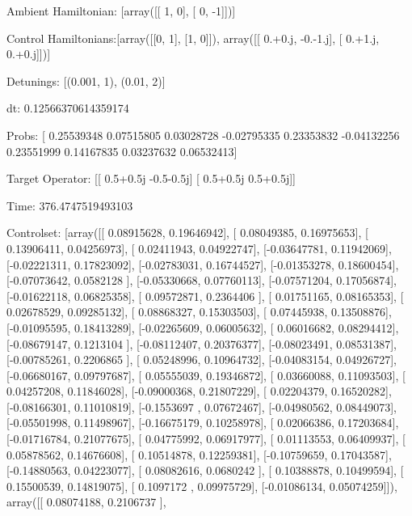 \documentclass{article}
\begin{document}
    

\newpage

Ambient Hamiltonian: [array([[ 1,  0],
       [ 0, -1]])]

Control Hamiltonians:[array([[0, 1],
       [1, 0]]), array([[ 0.+0.j, -0.-1.j],
       [ 0.+1.j,  0.+0.j]])]

Detunings: [(0.001, 1), (0.01, 2)]

 dt: 0.12566370614359174

Probs: [ 0.25539348  0.07515805  0.03028728 -0.02795335  0.23353832 -0.04132256
  0.23551999  0.14167835  0.03237632  0.06532413]

Target Operator: [[ 0.5+0.5j -0.5-0.5j]
 [ 0.5+0.5j  0.5+0.5j]]

Time: 376.4747519493103

Controlset: [array([[ 0.08915628,  0.19646942],
       [ 0.08049385,  0.16975653],
       [ 0.13906411,  0.04256973],
       [ 0.02411943,  0.04922747],
       [-0.03647781,  0.11942069],
       [-0.02221311,  0.17823092],
       [-0.02783031,  0.16744527],
       [-0.01353278,  0.18600454],
       [-0.07073642,  0.0582128 ],
       [-0.05330668,  0.07760113],
       [-0.07571204,  0.17056874],
       [-0.01622118,  0.06825358],
       [ 0.09572871,  0.2364406 ],
       [ 0.01751165,  0.08165353],
       [ 0.02678529,  0.09285132],
       [ 0.08868327,  0.15303503],
       [ 0.07445938,  0.13508876],
       [-0.01095595,  0.18413289],
       [-0.02265609,  0.06005632],
       [ 0.06016682,  0.08294412],
       [-0.08679147,  0.1213104 ],
       [-0.08112407,  0.20376377],
       [-0.08023491,  0.08531387],
       [-0.00785261,  0.2206865 ],
       [ 0.05248996,  0.10964732],
       [-0.04083154,  0.04926727],
       [-0.06680167,  0.09797687],
       [ 0.05555039,  0.19346872],
       [ 0.03660088,  0.11093503],
       [ 0.04257208,  0.11846028],
       [-0.09000368,  0.21807229],
       [ 0.02204379,  0.16520282],
       [-0.08166301,  0.11010819],
       [-0.1553697 ,  0.07672467],
       [-0.04980562,  0.08449073],
       [-0.05501998,  0.11498967],
       [-0.16675179,  0.10258978],
       [ 0.02066386,  0.17203684],
       [-0.01716784,  0.21077675],
       [ 0.04775992,  0.06917977],
       [ 0.01113553,  0.06409937],
       [ 0.05878562,  0.14676608],
       [ 0.10514878,  0.12259381],
       [-0.10759659,  0.17043587],
       [-0.14880563,  0.04223077],
       [ 0.08082616,  0.0680242 ],
       [ 0.10388878,  0.10499594],
       [ 0.15500539,  0.14819075],
       [ 0.1097172 ,  0.09975729],
       [-0.01086134,  0.05074259]]), array([[ 0.08074188,  0.2106737 ],
\end{document}
